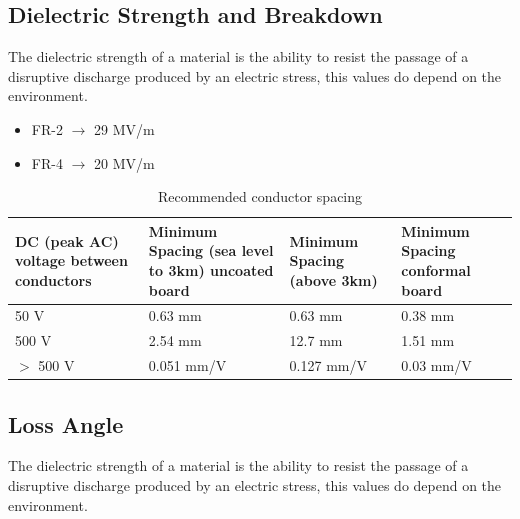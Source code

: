 	\subsection{Dielectric Strength and Breakdown}
		The dielectric strength of a material is the ability to resist the passage of a disruptive discharge produced by an electric stress, this values do depend on the environment. 
		\begin{itemize}
			\setlength{\itemsep}{-5pt}
			\item[] FR-2 $\rightarrow$ 29 MV/m
			\item[] FR-4 $\rightarrow$ 20 MV/m
		\end{itemize}
		\begin{table}[h!]
			\centering
			\begin{tabular}{|m{0.2\textwidth}|m{}|m{}|m{}|}
				\hline
					\textbf{DC (peak AC) voltage between conductors} & \textbf{Minimum Spacing (sea level to 3km) uncoated board} & \textbf{Minimum Spacing (above 3km)} & \textbf{Minimum Spacing conformal board}\\
				\hline
				\hline
					50 V & 0.63 mm & 0.63 mm & 0.38 mm  \\
				\hline
					500 V & 2.54 mm & 12.7 mm & 1.51 mm  \\
				\hline
					$>$ 500 V & 0.051 mm/V & 0.127 mm/V & 0.03 mm/V \\
				\hline
			\end{tabular}
			\caption{Recommended conductor spacing}
			\label{Tab:ConductorSpacing}
		\end{table}
		
	\subsection{Loss Angle}
		The dielectric strength of a material is the ability to resist the passage of a disruptive discharge produced by an electric stress, this values do depend on the environment. 

